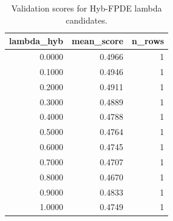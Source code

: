 \begin{table}[t]
\caption{Validation scores for Hyb-FPDE lambda candidates.}
\label{tab:lambda_distribution_computed}
\centering
\begin{tabular}{rrr}
\toprule
lambda\_hyb & mean\_score & n\_rows \\
\midrule
0.0000 & 0.4966 & 1 \\
0.1000 & 0.4946 & 1 \\
0.2000 & 0.4911 & 1 \\
0.3000 & 0.4889 & 1 \\
0.4000 & 0.4788 & 1 \\
0.5000 & 0.4764 & 1 \\
0.6000 & 0.4745 & 1 \\
0.7000 & 0.4707 & 1 \\
0.8000 & 0.4670 & 1 \\
0.9000 & 0.4833 & 1 \\
1.0000 & 0.4749 & 1 \\
\bottomrule
\end{tabular}

\end{table}
